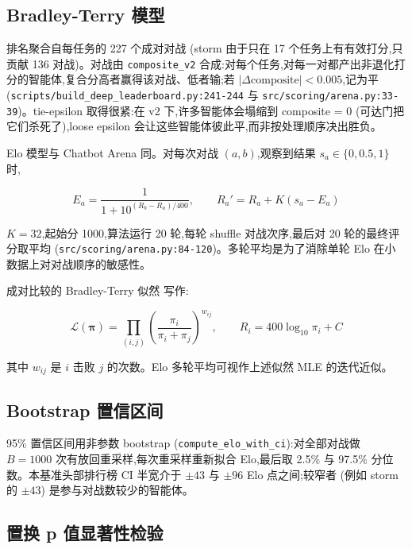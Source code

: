 \documentclass[UTF8,a4paper,12pt,oneside]{ctexart}
\begin{document}
\subsection{Bradley-Terry 模型}

排名聚合自每任务的 227 个成对对战 (storm 由于只在 17 个任务上有有效打分,只贡献 136 对战)。对战由 \texttt{composite\_v2} 合成:对每个任务,对每一对都产出非退化打分的智能体,复合分高者赢得该对战、低者输;若 \(|\Delta \text{composite}| < 0.005\),记为平 (\texttt{scripts/build\_deep\_leaderboard.py:241-244} 与 \texttt{src/scoring/arena.py:33-39})。tie-epsilon 取得很紧:在 v2 下,许多智能体会塌缩到 composite = 0 (可达门把它们杀死了),loose epsilon 会让这些智能体彼此平,而非按处理顺序决出胜负。

Elo 模型与 Chatbot Arena \cite{arena} 同。对每次对战 \((a, b)\),观察到结果 \(s_a \in \{0, 0.5, 1\}\) 时,

\begin{equation}
E_a = \frac{1}{1 + 10^{(R_b - R_a)/400}}, \qquad R_a' = R_a + K (s_a - E_a)
\end{equation}

\(K = 32\),起始分 1000,算法运行 20 轮,每轮 shuffle 对战次序,最后对 20 轮的最终评分取平均 (\texttt{src/scoring/arena.py:84-120})。多轮平均是为了消除单轮 Elo 在小数据上对对战顺序的敏感性。

成对比较的 Bradley-Terry 似然 \cite{bt} 写作:

\begin{equation}
\mathcal{L}(\boldsymbol{\pi}) = \prod_{(i, j)} \left( \frac{\pi_i}{\pi_i + \pi_j} \right)^{w_{ij}}, \qquad R_i = 400 \log_{10} \pi_i + C
\end{equation}

其中 \(w_{ij}\) 是 \(i\) 击败 \(j\) 的次数。Elo 多轮平均可视作上述似然 MLE 的迭代近似。

\subsection{Bootstrap 置信区间}

95\% 置信区间用非参数 bootstrap (\texttt{compute\_elo\_with\_ci}):对全部对战做 \(B = 1000\) 次有放回重采样,每次重采样重新拟合 Elo,最后取 2.5\% 与 97.5\% 分位数。本基准头部排行榜 CI 半宽介于 \(\pm 43\) 与 \(\pm 96\) Elo 点之间;较窄者 (例如 storm 的 \(\pm 43\)) 是参与对战数较少的智能体。

\subsection{置换 p 值显著性检验}
\end{document}
